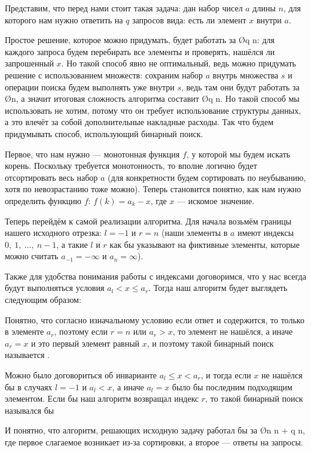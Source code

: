 Представим, что перед нами стоит такая задача: дан набор чисел $a$ длины $n$, для которого нам нужно ответить на $q$ запросов вида: есть ли элемент $x$ внутри $a$.

Простое решение, которое можно придумать, будет работать за \O{q \cdot n}: для каждого запроса будем перебирать все элементы и проверять, нашёлся ли запрошенный $x$. Но такой способ явно не оптимальный, ведь можно придумать решение с использованием множеств: сохраним набор $a$ внутрь множества $s$ и операции поиска будем выполнять уже внутри $s$, ведь там они будут работать за \O{\log n}, а значит итоговая сложность алгоритма составит \O{q \log n}. Но такой способ мы использовать не хотим, потому что он требует использование структуры данных, а это влечёт за собой дополнительные накладные расходы. Так что будем придумывать способ, использующий бинарный поиск.

Первое, что нам нужно — монотонная функция $f$, у которой мы будем искать корень. Поскольку требуется монотонность, то вполне логично будет отсортировать весь набор $a$ (для конкретности будем сортировать по неубыванию, хотя по невозрастанию тоже можно). Теперь становится понятно, как нам нужно определить функцию $f$: $f(k) = a_k - x$, где $x$ — искомое значение.

Теперь перейдём к самой реализации алгоритма. Для начала возьмём границы нашего исходного отрезка: $l=-1$ и $r=n$ (наши элементы в $a$ имеют индексы $0,\ 1,\ \ldots,\ n-1$, а такие $l$ и $r$ как бы указывают на фиктивные элементы, которые можно считать $a_{-1} = -\infty$ и $a_n = \infty$).

Также для удобства понимания работы с индексами договоримся, что у нас всегда будут выполняться условия $a_l < x \leq a_r$. Тогда наш алгоритм будет выглядеть следующим образом:


Понятно, что согласно изначальному условию если ответ и содержится, то только в элементе $a_r$, поэтому если $r = n$ или $a_r > x$, то элемент не нашёлся, а иначе $a_r = x$ и это первый элемент равный $x$, и поэтому такой бинарный поиск называется .

Можно было договориться об инварианте $a_l \leq x < a_r$, и тогда если $x$ не нашёлся бы в случаях $l = -1$ и $a_l < x$, а иначе $a_l = x$ было бы последним подходящим элементом. Если бы наш алгоритм возвращал индекс $r$, то такой бинарный поиск назывался бы 

И понятно, что алгоритм, решающих исходную задачу работал бы за \O{n \log n + q \log n}, где первое слагаемое возникает из-за сортировки, а второе — ответы на запросы.


